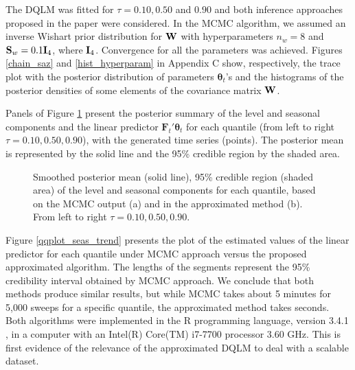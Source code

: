 \documentclass[12pt,a4paper]{article}\usepackage[]{graphicx}\usepackage[]{color}\usepackage{subfigure}
\newcommand{\bfFt}{\mathbf{F}_t}
\newcommand{\bftheta}{\boldsymbol{\theta}}
\begin{document}
 
 The DQLM was fitted for $\tau=0.10,0.50$ and $0.90$ and both inference approaches proposed in the paper were considered. 
 In the MCMC algorithm, we assumed an inverse Wishart prior distribution for ${\bf W}$ with hyperparameters $n_w = 8$ and 
 ${\bf S}_w = 0.1{\bf I}_4$, where ${\bf I}_{4}$. 
 Convergence for all the parameters was achieved. 
 Figures \ref{chain_saz} and \ref{hist_hyperparam} in Appendix C show, respectively, the trace plot with the posterior distribution of 
 parameters $\bftheta_t$'s and the histograms of the posterior densities of some elements of the covariance  matrix ${\bf W}$.
  
Panels of Figure \ref{thetas} present the posterior summary of the level and seasonal components and  
the linear predictor $\bfFt'\bftheta_t$ for each quantile (from left to right $\tau=0.10, 0.50, 0.90$), with the generated  time series  (points). The  posterior mean is represented by the solid line and  
the 95\% credible region by the shaded area. 

\clearpage

 \begin{figure}[h!]
\begin{center}
\end{center}
\vspace{-0.5 cm}\caption{Smoothed posterior mean (solid line), 95\% credible region (shaded area) of the level and seasonal components for each quantile, based on the MCMC output (a) and in the approximated method (b). From left to right $\tau=0.10, 0.50, 0.90$.}\label{thetas}
\end{figure}

 \clearpage
 


Figure \ref{qqplot_seas_trend} presents the plot of the estimated values of the linear predictor for each quantile under MCMC approach versus the proposed approximated algorithm. 
The lengths of the segments represent the 95\% credibility interval obtained by MCMC approach. 
We conclude that both methods produce similar results, but while MCMC takes about 5 minutes for 5,000 sweeps for a specific quantile, the approximated method takes seconds. 
Both algorithms were implemented in the R programming language, version 3.4.1 \cite{teamR}, in a computer with an Intel(R) Core(TM) i7-7700 processor 3.60 GHz.
This is first evidence of the relevance of the approximated DQLM  to deal with a scalable dataset.
\end{document}
